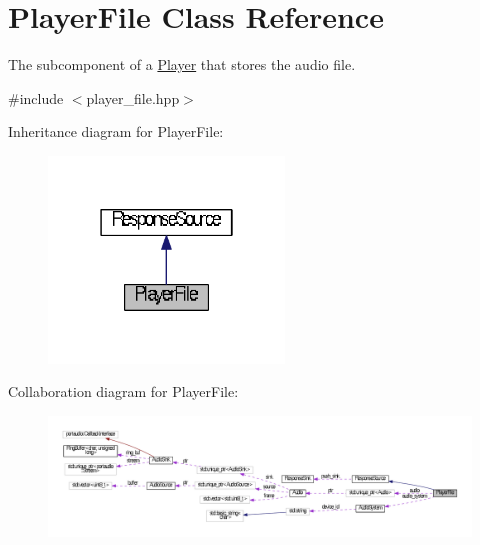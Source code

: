 \hypertarget{classPlayerFile}{\section{Player\+File Class Reference}
\label{classPlayerFile}
}


The subcomponent of a \hyperlink{classPlayer}{Player} that stores the audio file.  




{\ttfamily \#include $<$player\+\_\+file.\+hpp$>$}



Inheritance diagram for Player\+File\+:
\nopagebreak
\begin{figure}[H]
\begin{center}
\leavevmode
\includegraphics[width=178pt]{classPlayerFile__inherit__graph}
\end{center}
\end{figure}


Collaboration diagram for Player\+File\+:
\nopagebreak
\begin{figure}[H]
\begin{center}
\leavevmode
\includegraphics[width=350pt]{classPlayerFile__coll__graph}
\end{center}
\end{figure}
